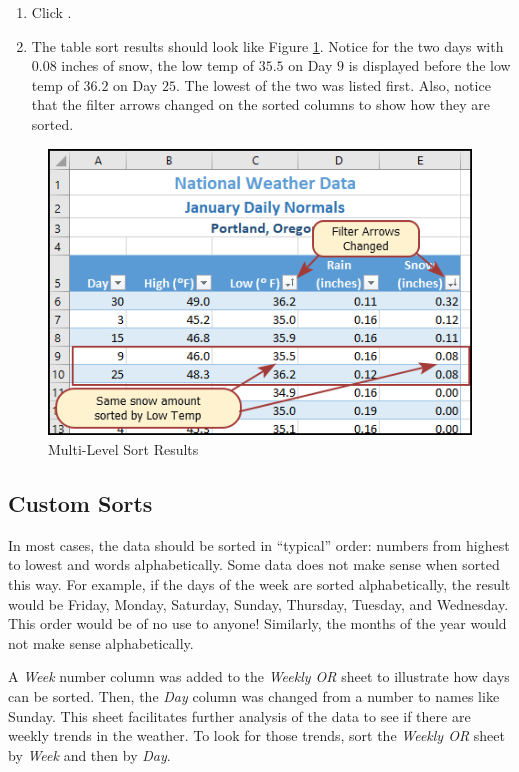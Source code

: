 \begin{enumbox}
\begin{enumerate}
		\item Click .
		\item The table sort results should look like Figure \ref{05:fig12}. Notice for the two days with $ 0.08 $ inches of snow, the low temp of $ 35.5 $ on Day $ 9 $ is displayed before the low temp of $ 36.2 $ on Day $ 25 $. The lowest of the two was listed first. Also, notice that the filter arrows changed on the sorted columns to show how they are sorted.
	\end{enumerate}
\end{enumbox}

\begin{figure}[H]
	\centering
	\includegraphics[width=\maxwidth{.95\linewidth}]{gfx/ch05_fig12}
	\caption{Multi-Level Sort Results}
	\label{05:fig12}
\end{figure}

\subsection{Custom Sorts}

In most cases, the data should be sorted in ``typical'' order: numbers from highest to lowest and words alphabetically. Some data does not make sense when sorted this way. For example, if the days of the week are sorted alphabetically, the result would be Friday, Monday, Saturday, Sunday, Thursday, Tuesday, and Wednesday. This order would be of no use to anyone! Similarly, the months of the year would not make sense alphabetically.

A \textit{Week} number column was added to the \textit{Weekly OR} sheet to illustrate how days can be sorted. Then, the \textit{Day} column was changed from a number to names like Sunday. This sheet facilitates further analysis of the data to see if there are weekly trends in the weather. To look for those trends, sort the \textit{Weekly OR} sheet by \textit{Week} and then by \textit{Day}.

